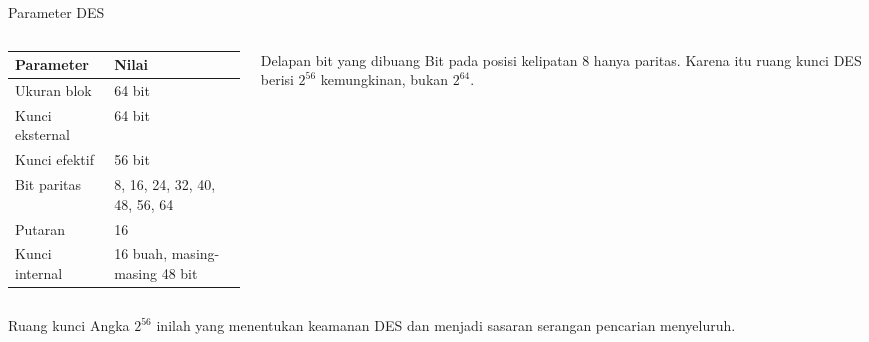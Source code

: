 \documentclass[aspectratio=169,11pt]{beamer}
\begin{document}
\begin{frame}{Parameter DES}
    \begin{columns}[T,onlytextwidth]
        \begin{column}{0.56\textwidth}
            \small
            \begin{tabular}{@{}ll@{}}
                \toprule
                \textbf{Parameter} & \textbf{Nilai} \\
                \midrule
                Ukuran blok & 64 bit \\
                Kunci eksternal & 64 bit \\
                Kunci efektif & 56 bit \\
                Bit paritas & 8, 16, 24, 32, 40, 48, 56, 64 \\
                Putaran & 16 \\
                Kunci internal & 16 buah, masing-masing 48 bit \\
                \bottomrule
            \end{tabular}
        \end{column}
        \begin{column}{0.40\textwidth}
            \begin{alertblock}{Delapan bit yang dibuang}
                \footnotesize
                Bit pada posisi kelipatan 8 hanya paritas. Karena itu
                ruang kunci DES berisi $2^{56}$ kemungkinan, bukan
                $2^{64}$.
            \end{alertblock}
        \end{column}
    \end{columns}
    \vspace{0.25cm}
    \begin{block}{Ruang kunci}
        \footnotesize
        Angka $2^{56}$ inilah yang menentukan keamanan DES dan menjadi
        sasaran serangan pencarian menyeluruh.
    \end{block}
\end{frame}
\end{document}
